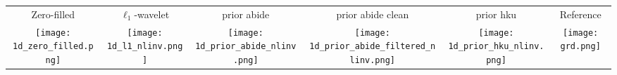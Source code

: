 
\begin{tabular}{c @{\hskip 0pt} c @{\hskip 0pt} c @{\hskip 0pt} c @{\hskip 0pt} c @{\hskip 0pt} c}
    Zero-filled& $\ell_1$-wavelet & prior abide & prior abide clean & prior hku & Reference\\
    \texttt{[image: 1d\_zero\_filled.png]}&
    \texttt{[image: 1d\_l1\_nlinv.png]}&
    \texttt{[image: 1d\_prior\_abide\_nlinv.png]}&
    \texttt{[image: 1d\_prior\_abide\_filtered\_nlinv.png]}&
    \texttt{[image: 1d\_prior\_hku\_nlinv.png]}&
    \texttt{[image: grd.png]}
\end{tabular}